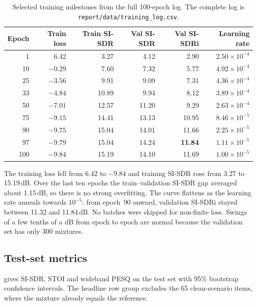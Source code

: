 \documentclass[11pt,a4paper]{article}
\newcommand{\sisdr}{SI-SDR}
\newcommand{\sisdri}{SI-SDRi}
\begin{document}
\begin{table}[htbp]
\centering\footnotesize
\caption{Selected training milestones from the full 100-epoch log. The complete log is
\texttt{report/data/training\_log.csv}.}
\label{tab:milestones}
\begin{tabular}{@{}r r r r r r@{}}
\toprule
\textbf{Epoch} & \textbf{Train loss} & \textbf{Train \sisdr} & \textbf{Val \sisdr} &
\textbf{Val \sisdri} & \textbf{Learning rate}\\
\midrule
1   & 6.42   & 3.27  & 4.12  & 2.90  & $2.50\times10^{-4}$\\
10  & $-0.29$& 7.60  & 7.32  & 5.77  & $4.92\times10^{-4}$\\
25  & $-3.56$& 9.91  & 9.09  & 7.31  & $4.36\times10^{-4}$\\
33  & $-4.84$& 10.89 & 9.94  & 8.12  & $3.89\times10^{-4}$\\
50  & $-7.01$& 12.57 & 11.20 & 9.29  & $2.63\times10^{-4}$\\
75  & $-9.15$& 14.41 & 13.13 & 10.95 & $8.46\times10^{-5}$\\
90  & $-9.75$& 15.04 & 14.01 & 11.66 & $2.25\times10^{-5}$\\
97  & $-9.79$& 15.04 & 14.24 & \textbf{11.84} & $1.11\times10^{-5}$\\
100 & $-9.84$& 15.19 & 14.10 & 11.69 & $1.00\times10^{-5}$\\
\bottomrule
\end{tabular}
\end{table}

The training loss fell from 6.42 to $-9.84$ and training \sisdr{} rose from 3.27 to 15.19\,dB.
Over the last ten epochs the train--validation \sisdr{} gap averaged about 1.15\,dB, so there is
no strong overfitting. The curve flattens as the learning rate anneals towards $10^{-5}$: from
epoch~90 onward, validation \sisdri{} stayed between 11.32 and 11.84\,dB. No batches were skipped
for non-finite loss. Swings of a few tenths of a dB from epoch to epoch are normal because the
validation set has only 300 mixtures.

\subsection{Test-set metrics}
\label{sec:testmetrics}
 gives \sisdr, STOI and wideband PESQ on the test set with 95\% bootstrap
confidence intervals. The headline row group excludes the 65 clean-scenario items, where the
mixture already equals the reference.
\end{document}
